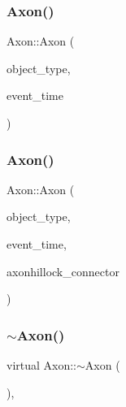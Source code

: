 \mbox{\label{classAxon_a0ca4cd87ad4a2719c6b7c8c3d46dcbc6}} 
\subsubsection{\texorpdfstring{Axon()}{Axon()}\hspace{0.1cm}{\footnotesize\ttfamily [3/4]}}
{\footnotesize\ttfamily Axon\+::\+Axon (\begin{DoxyParamCaption}\item[{unsigned int}]{object\+\_\+type,  }\item[{std\+::chrono\+::time\+\_\+point$<$ \mbox{\hyperlink{universe_8h_a0ef8d951d1ca5ab3cfaf7ab4c7a6fd80}{Clock}} $>$}]{event\+\_\+time }\end{DoxyParamCaption})\hspace{0.3cm}{\ttfamily [inline]}}

\mbox{\label{classAxon_afaffed720efb3cb75e46088c5fb81d95}} 
\subsubsection{\texorpdfstring{Axon()}{Axon()}\hspace{0.1cm}{\footnotesize\ttfamily [4/4]}}
{\footnotesize\ttfamily Axon\+::\+Axon (\begin{DoxyParamCaption}\item[{unsigned int}]{object\+\_\+type,  }\item[{std\+::chrono\+::time\+\_\+point$<$ \mbox{\hyperlink{universe_8h_a0ef8d951d1ca5ab3cfaf7ab4c7a6fd80}{Clock}} $>$}]{event\+\_\+time,  }\item[{\mbox{\hyperlink{classAxonHillock}{Axon\+Hillock}} \&}]{axonhillock\+\_\+connector }\end{DoxyParamCaption})\hspace{0.3cm}{\ttfamily [inline]}}

\mbox{\label{classAxon_af000507f0ff0527d1743e90d2e756282}} 
\subsubsection{\texorpdfstring{$\sim$\+Axon()}{~Axon()}}
{\footnotesize\ttfamily virtual Axon\+::$\sim$\+Axon (\begin{DoxyParamCaption}{ }\end{DoxyParamCaption})\hspace{0.3cm}{\ttfamily [inline]}, {\ttfamily [virtual]}}

